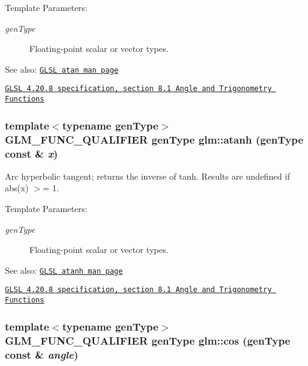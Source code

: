 \begin{Desc}
\item[Template Parameters:]
\begin{description}
\item[{\em genType}]Floating-point scalar or vector types.\end{description}
\end{Desc}
\begin{Desc}
\item[See also:]\href{http://www.opengl.org/sdk/docs/manglsl/xhtml/atan.xml}{\tt GLSL atan man page} 

\href{http://www.opengl.org/registry/doc/GLSLangSpec.4.20.8.pdf}{\tt GLSL 4.20.8 specification, section 8.1 Angle and Trigonometry Functions} \end{Desc}
\hypertarget{group__core__func__trigonometric_g5207916954ad98477bf488a9a188f045}{
\subsubsection[atanh]{\setlength{\rightskip}{0pt plus 5cm}template$<$typename genType$>$ GLM\_\-FUNC\_\-QUALIFIER genType glm::atanh (genType const \& {\em x})}}
\label{group__core__func__trigonometric_g5207916954ad98477bf488a9a188f045}


Arc hyperbolic tangent; returns the inverse of tanh. Results are undefined if abs(x) $>$= 1.

\begin{Desc}
\item[Template Parameters:]
\begin{description}
\item[{\em genType}]Floating-point scalar or vector types.\end{description}
\end{Desc}
\begin{Desc}
\item[See also:]\href{http://www.opengl.org/sdk/docs/manglsl/xhtml/atanh.xml}{\tt GLSL atanh man page} 

\href{http://www.opengl.org/registry/doc/GLSLangSpec.4.20.8.pdf}{\tt GLSL 4.20.8 specification, section 8.1 Angle and Trigonometry Functions} \end{Desc}
\hypertarget{group__core__func__trigonometric_gfef15df90786cd24fe786cc0ff2cbc98}{
\subsubsection[cos]{\setlength{\rightskip}{0pt plus 5cm}template$<$typename genType$>$ GLM\_\-FUNC\_\-QUALIFIER genType glm::cos (genType const \& {\em angle})}}
\label{group__core__func__trigonometric_gfef15df90786cd24fe786cc0ff2cbc98}


